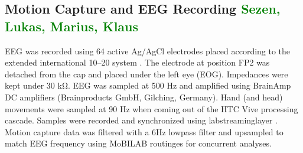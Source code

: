\subsection{Motion Capture and EEG Recording \textcolor{green}{Sezen, Lukas, Marius, Klaus}}
EEG was recorded using 64 active Ag/AgCl electrodes placed according to the extended international 10–20 system \cite{chatrian_ten_1985}. The electrode at position FP2 was detached from the cap and placed under the left eye (EOG). Impedances were kept under 30 \si{\kohm}. EEG was sampled at 500 Hz and amplified using BrainAmp DC amplifiers (Brainproducts GmbH, Gilching, Germany). Hand (and head) movements were sampled at 90 Hz when coming out of the HTC Vive processing cascade. Samples were recorded and synchronized using labstreaminglayer \cite{}. Motion capture data was filtered with a 6Hz lowpass filter and upsampled to match EEG frequency using MoBILAB routinges \cite{} for concurrent analyses.
